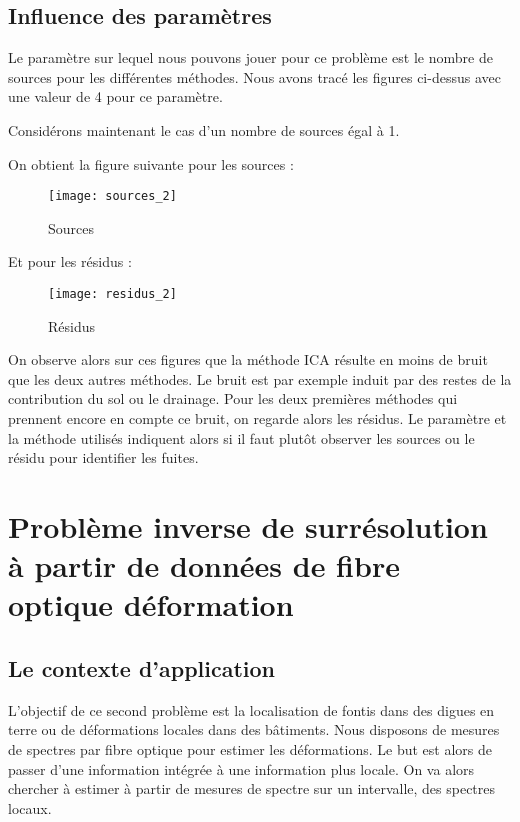 \documentclass[12pt,a4paper,titlepage]{scrartcl}
\begin{document}
\subsection{Influence des paramètres}

Le paramètre sur lequel nous pouvons jouer pour ce problème est le nombre
de sources pour les différentes méthodes. Nous avons tracé les figures ci-dessus
avec une valeur de 4 pour ce paramètre.

Considérons maintenant  le cas d'un nombre de sources égal à 1.

On obtient la figure suivante pour les sources :

\begin{figure}[H]
    \caption{Sources}
    \texttt{[image: sources\_2]}
    \centering
\end{figure}

Et pour les résidus :

\begin{figure}[H]
    \caption{Résidus}
    \texttt{[image: residus\_2]}
    \centering
\end{figure}

On observe alors sur ces figures que la méthode ICA résulte en moins de bruit que les
deux autres méthodes. Le bruit est par exemple induit par des restes de la contribution
du sol ou le drainage. Pour les deux premières méthodes qui prennent encore en compte ce
bruit, on regarde alors les résidus. Le paramètre et la méthode utilisés indiquent alors si
il faut plutôt observer les sources ou le résidu pour identifier les fuites.

\pagebreak

\section{Problème inverse de surrésolution à partir de données de fibre optique déformation}

\subsection{Le contexte d'application}

L'objectif de ce second problème est la localisation de fontis dans des digues en terre ou
de déformations locales dans des bâtiments. Nous disposons de mesures de spectres par fibre
optique pour estimer les déformations. Le but est alors de passer d'une information intégrée
à une information plus locale. On va alors chercher à estimer à partir de mesures de spectre
sur un intervalle, des spectres locaux.
\end{document}
